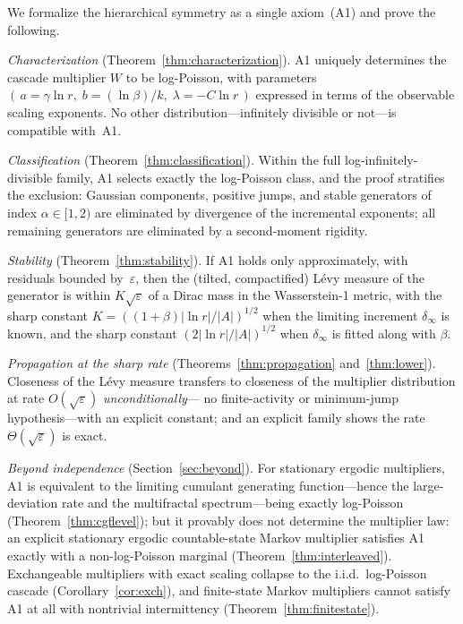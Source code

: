 \documentclass[pdflatex,sn-mathphys-num]{sn-jnl}
\theoremstyle{thmstyleone}
\theoremstyle{thmstyletwo}
\theoremstyle{thmstylethree}
\begin{document}
We formalize the hierarchical symmetry as a single axiom~(A1) and
prove the following.

\emph{Characterization}
(Theorem~\ref{thm:characterization}).  A1 uniquely determines the
cascade multiplier $W$ to be log-Poisson, with parameters
$(\,a = \gamma\ln r,\; b = (\ln\beta)/k,\; \lambda = -C\ln r\,)$
expressed in terms of the observable scaling exponents.  No other
distribution---infinitely divisible or not---is compatible with~A1.

\emph{Classification}
(Theorem~\ref{thm:classification}).  Within the full
log-infinitely-divisible family, A1 selects exactly the log-Poisson
class, and the proof stratifies the exclusion: Gaussian components,
positive jumps, and stable generators of index $\alpha \in [1,2)$ are
eliminated by divergence of the incremental exponents; all remaining
generators are eliminated by a second-moment rigidity.

\emph{Stability}
(Theorem~\ref{thm:stability}).  If A1 holds only approximately, with
residuals bounded by~$\varepsilon$, then the (tilted, compactified)
L\'evy measure of the generator is within $K\sqrt{\varepsilon}$ of a
Dirac mass in the Wasserstein-1 metric, with the sharp constant
$K = ((1+\beta)|\ln r|/|A|)^{1/2}$ when the limiting increment
$\delta_\infty$ is known, and the sharp constant
$(2|\ln r|/|A|)^{1/2}$ when $\delta_\infty$ is fitted along with
$\beta$.

\emph{Propagation at the sharp rate}
(Theorems~\ref{thm:propagation} and~\ref{thm:lower}).  Closeness of
the L\'evy measure transfers to closeness of the multiplier
distribution at rate $O(\sqrt\varepsilon)$ \emph{unconditionally}---%
no finite-activity or minimum-jump hypothesis---with an explicit
constant; and an explicit family shows the rate
$\Theta(\sqrt\varepsilon)$ is exact.

\emph{Beyond independence}
(Section~\ref{sec:beyond}).  For stationary ergodic multipliers, A1
is equivalent to the limiting cumulant generating function---hence
the large-deviation rate and the multifractal spectrum---being
exactly log-Poisson (Theorem~\ref{thm:cgflevel}); but it provably
does not determine the multiplier law: an explicit stationary
ergodic countable-state Markov multiplier satisfies A1 exactly with
a non-log-Poisson marginal (Theorem~\ref{thm:interleaved}).
Exchangeable multipliers with exact scaling collapse to the i.i.d.\
log-Poisson cascade (Corollary~\ref{cor:exch}), and finite-state
Markov multipliers cannot satisfy A1 at all with nontrivial
intermittency (Theorem~\ref{thm:finitestate}).
\end{document}

